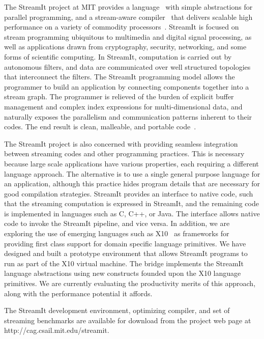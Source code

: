 The StreamIt project at MIT provides a language~\cite{streamitcc} with
simple abstractions for parallel programming, and a stream-aware
compiler~\cite{agrawal05cases,gordon02asplos,lamb03pldi,sermulins05lctes}
that delivers scalable high performance on a variety of commodity
processors~\cite{gordon02asplos, raw04isca}. StreamIt is focused on
stream programming ubiquitous to multimedia and digital signal
processing, as well as applications drawn from cryptography, security,
networking, and some forms of scientific computing. In StreamIt,
computation is carried out by autonomous filters, and data are
communicated over well structured topologies that interconnect the
filters. The StreamIt programming model allows the programmer to build
an application by connecting components together into a stream
graph. The programmer is relieved of the burden of explicit buffer
management and complex index expressions for multi-dimensional data,
and naturally exposes the parallelism and communication patterns
inherent to their codes.  The end result is clean, malleable, and
portable code~\cite{drake06ipdps}.

The StreamIt project is also concerned with providing seamless
integration between streaming codes and other programming
practices. This is necessary because large scale applications have
various properties, each requiring a different language approach. The
alternative is to use a single general purpose language for an
application, although this practice hides program details that are
necessary for good compilation strategies. StreamIt provides an
interface to native code, such that the streaming computation is
expressed in StreamIt, and the remaining code is implemented in
languages such as C, C++, or Java. The interface allows native code to
invoke the StreamIt pipeline, and vice versa.  In addition, we are
exploring the use of emerging languages such as X10~\cite{x10} as
frameworks for providing first class support for domain specific
language primitives. We have designed and built a prototype
environment that allows StreamIt programs to run as part of the X10
virtual machine. The bridge implements the StreamIt language
abstractions using new constructs founded upon the X10 language
primitives. We are currently evaluating the productivity merits of
this approach, along with the performance potential it affords.

The StreamIt development environment, optimizing compiler, and set of
streaming benchmarks are available for download from the project
web page at http://cag.csail.mit.edu/streamit.
